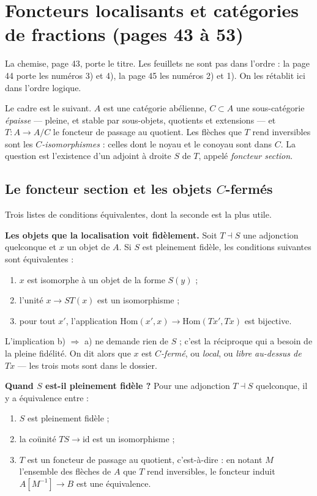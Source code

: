 \documentclass[11pt,a4paper]{article}
\begin{document}
\section*{Foncteurs localisants et catégories de fractions (pages 43 à 53)}

La chemise, page 43, porte le titre. Les feuillets ne sont pas dans l'ordre :
la page 44 porte les numéros 3) et 4), la page 45 les numéros 2) et 1). On les
rétablit ici dans l'ordre logique.

Le cadre est le suivant. $A$ est une catégorie abélienne, $C \subset A$ une
sous-catégorie \emph{épaisse} — pleine, et stable par sous-objets, quotients et
extensions — et $T : A \to A/C$ le foncteur de passage au quotient. Les flèches
que $T$ rend inversibles sont les \emph{$C$-isomorphismes} : celles dont le
noyau et le conoyau sont dans $C$. La question est l'existence d'un adjoint à
droite $S$ de $T$, appelé \emph{foncteur section}.

\subsection*{Le foncteur section et les objets $C$-fermés}

Trois listes de conditions équivalentes, dont la seconde est la plus utile.


\textbf{Les objets que la localisation voit fidèlement.} Soit $T \dashv S$ une
adjonction quelconque et $x$ un objet de $A$. Si $S$ est pleinement fidèle, les
conditions suivantes sont équivalentes :

\begin{enumerate}
\item[a)] $x$ est isomorphe à un objet de la forme $S(y)$ ;
\item[b)] l'unité $x \to ST(x)$ est un isomorphisme ;
\item[c)] pour tout $x'$, l'application
$\mathrm{Hom}(x', x) \to \mathrm{Hom}(Tx', Tx)$ est bijective.
\end{enumerate}

L'implication b) $\Rightarrow$ a) ne demande rien de $S$ ; c'est la réciproque
qui a besoin de la pleine fidélité. On dit alors que $x$ est \emph{$C$-fermé},
ou \emph{local}, ou \emph{libre au-dessus de $Tx$} — les trois mots sont dans
le dossier.


\textbf{Quand $S$ est-il pleinement fidèle ?} Pour une adjonction $T \dashv S$
quelconque, il y a équivalence entre :

\begin{enumerate}
\item[a)] $S$ est pleinement fidèle ;
\item[b)] la coünité $TS \to \mathrm{id}$ est un isomorphisme ;
\item[c)] $T$ est un foncteur de passage au quotient, c'est-à-dire : en notant
$M$ l'ensemble des flèches de $A$ que $T$ rend inversibles, le foncteur induit
$A[M^{-1}] \to B$ est une équivalence.
\end{enumerate}
\end{document}

